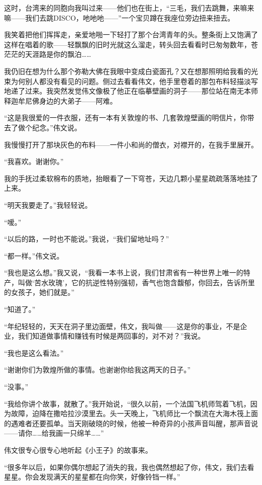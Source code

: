 \par 这时，台湾来的同胞向我叫过来——他们也在街上，“三毛，我们去跳舞，来嘛来嘛——我们去跳DISCO，吔吔吔——”一个宝贝蹲在我座位旁边扭来扭去。
\par 我笑着把他们挥挥走，亲爱地啪一下轻打了那个台湾青年的头。整条街上又饱满了这样在唱着的歌——轻飘飘的旧时光就这么溜走，转头回去看看时已匆匆数年，苍茫茫的天涯路是你的飘泊……
\par 我仍旧在想为什么那个弥勒大佛在我眼中变成白瓷面孔？又在想那照明给我看的光束为何别人都没有看见的问题。侧过去看看伟文，他手里卷着的那包布料轻描淡写地递了过来。我突然发觉伟文像极了他正在临摹壁画的洞子——那位站在南无本师释迦牟尼佛身边的大弟子——阿难。
\par “这是我很爱的一件衣服，还有一本有关敦煌的书、几套敦煌壁画的明信片，你带去了做个纪念。”伟文说。
\par 我慢慢打开了那块灰色的布料——一件小和尚的僧衣，对襟开的，在我手里展开。
\par “我喜欢。谢谢你。”
\par 我的手抚过柔软棉布的质地，抬眼看了一下穹苍，天边几颗小星星疏疏落落地挂了上来。
\par “明天我要走了。”我轻轻说。
\par “嗳。”
\par “以后的路，一时也不能说。”我说，“我们留地址吗？”
\par “都一样。”伟文说。
\par “我也是这么想。”我又说，“我看一本书上说，我们甘肃省有一种世界上唯一的特产，叫做‘苦水玫瑰’，它的抗逆性特别强韧，香气也饱含馥郁，你回去，告诉所里的女孩子，她们就是。”
\par “知道了。”
\par “年纪轻轻的，天天在洞子里边面壁，伟文，我叫做——这是你的事业，不是企业，我们知道做事情和赚钱有时候是两回事的，对不对？”我说。
\par “我也是这么看法。”
\par “谢谢你们为敦煌所做的事情。也谢谢你给我这两天的日子。”
\par “没事。”
\par “我给你讲个故事，就散了。”我开始说，“很久以前，一个法国飞机师驾着飞机，因为故障，迫降在撒哈拉沙漠里去。头一天晚上，飞机师比一个飘流在大海木筏上面的遇难者还要孤单。当天刚破晓的时候，他被一种奇异的小孩声音叫醒，那声音说——请你……给我画一只绵羊……”
\par 伟文很专心很专心地听起《小王子》的故事来。
\par “很多年以后，如果你偶尔想起了消失的我，我也偶然想起了你，伟文，我们去看星星。你会发现满天的星星都在向你笑，好像铃铛一样。”
